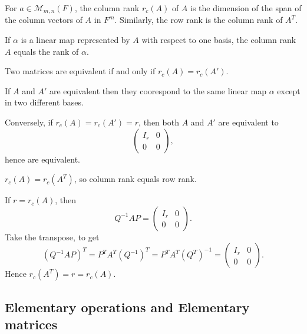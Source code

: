 \documentclass[12pt]{article}
\begin{document}
\begin{definition}
	For $a \in \mathcal{M}_{m, n}(F)$, the column rank $r_c(A)$ of $A$ is the dimension of the span of the column vectors of $A$ in $F^{m}$. Similarly, the row rank is the column rank of $A^{T}$.
\end{definition}

\begin{remark}
	If $\alpha$ is a linear map represented by $A$ with respect to one basis, the column rank $A$ equals the rank of $\alpha$.
\end{remark}

\begin{proposition}
	Two matrices are equivalent if and only if $r_c(A) = r_c(A')$.
\end{proposition}

\begin{proofbox}
	If $A$ and $A'$ are equivalent then they coorespond to the same linear map $\alpha$ except in two different bases.

Conversely, if $r_c(A) = r_c(A') = r$, then both $A$ and $A'$ are equivalent to
\[
\begin{pmatrix}
	I_r & 0 \\
	0 & 0
\end{pmatrix}
,\]
hence are equivalent.
\end{proofbox}

\begin{theorem}
	$r_c(A) = r_c(A^{T})$, so column rank equals row rank.
\end{theorem}

\begin{proofbox}
	If $r = r_c(A)$, then
	\[
	Q^{-1}AP =
	\begin{pmatrix}
		I_r & 0 \\
		0 & 0
	\end{pmatrix}
	.\]
	Take the transpose, to get
	\[
		(Q^{-1}AP)^{T} = P^{T}A^{T}(Q^{-1})^{T} = P^{T}A^{T}(Q^{T})^{-1} =
		\begin{pmatrix}
			I_r & 0 \\
			0 & 0
		\end{pmatrix}
	.\]
	Hence $r_c(A^{T}) = r = r_c(A)$.
\end{proofbox}

\subsection{Elementary operations and Elementary matrices}%
\label{sub:elementary_operations_and_elementary_matrices}
\end{document}
